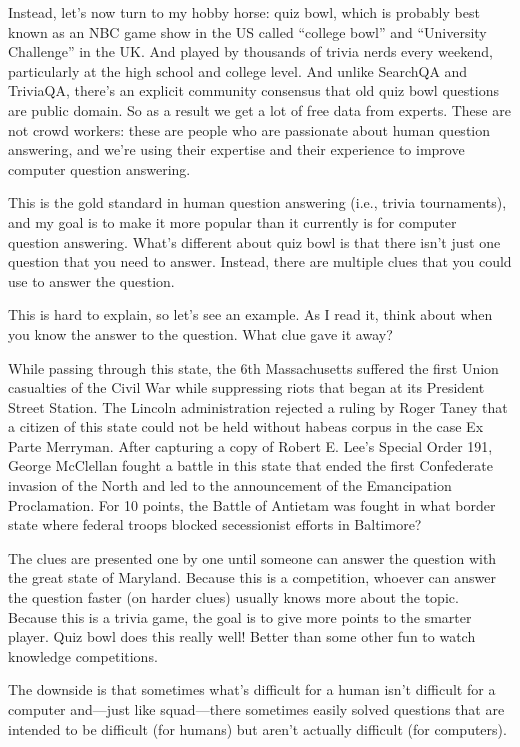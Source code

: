 Instead, let's now turn to my hobby horse: quiz bowl, which is probably best known as an NBC game show in the US called “college bowl” and “University Challenge” in the UK.  And played by thousands of trivia nerds every weekend, particularly at the high school and college level.  And unlike SearchQA and TriviaQA, there’s an explicit community consensus that old quiz bowl questions are public domain.  So as a result we get a lot of free data from experts. These are not crowd workers: these are people who are passionate about human question answering, and we're using their expertise and their experience to improve computer question answering.

This is the gold standard in human question answering (i.e., trivia tournaments), and my goal is to make it more popular than it currently is for computer question answering.  What’s different about quiz bowl is that there isn’t just one question that you need to answer.  Instead, there are multiple clues that you could use to answer the question.  

This is hard to explain, so let’s see an example.  As I read it, think about when you know the answer to the question.  What clue gave it away?

While passing through this state, the 6th Massachusetts
suffered the first Union casualties of the Civil War while
suppressing riots that began at its President Street
Station. The Lincoln administration rejected a ruling by
Roger Taney that a citizen of this state could not
be held without habeas corpus in the case Ex Parte
Merryman. After capturing a copy of Robert E. Lee’s
Special Order 191, George McClellan fought a battle in
this state that ended the first Confederate invasion of
the North and led to the announcement of the
Emancipation Proclamation. For 10 points, the Battle of
Antietam was fought in what border state where federal
troops blocked secessionist efforts in Baltimore?



The clues are presented one by one until someone can answer the question with the great state of Maryland. Because this is a competition, whoever can answer the question faster (on harder clues) usually knows more about the topic.  Because this is a trivia game, the goal is to give more points to the smarter player.  Quiz bowl does this really well!  Better than some other fun to watch knowledge competitions.

The downside is that sometimes what's difficult for a human isn't difficult for a computer and—just like squad—there sometimes easily solved questions that are intended to be difficult (for humans) but aren't actually difficult (for computers).  

